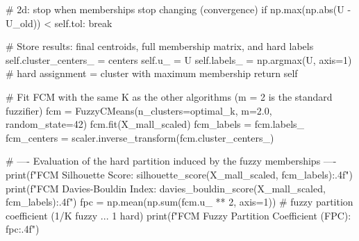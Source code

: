 \begin{codebox}[title={Fuzzy C-Means class (from scratch)}]
            # 2d: stop when memberships stop changing (convergence)
            if np.max(np.abs(U - U_old)) < self.tol:
                break

        # Store results: final centroids, full membership matrix, and hard labels
        self.cluster_centers_ = centers
        self.u_ = U
        self.labels_ = np.argmax(U, axis=1)  # hard assignment = cluster with maximum membership
        return self


# Fit FCM with the same K as the other algorithms (m = 2 is the standard fuzzifier)
fcm = FuzzyCMeans(n_clusters=optimal_k, m=2.0, random_state=42)
fcm.fit(X_mall_scaled)
fcm_labels = fcm.labels_
fcm_centers = scaler.inverse_transform(fcm.cluster_centers_)

# ---- Evaluation of the hard partition induced by the fuzzy memberships ----
print(f"FCM Silhouette Score: {silhouette_score(X_mall_scaled, fcm_labels):.4f}")
print(f"FCM Davies-Bouldin Index: {davies_bouldin_score(X_mall_scaled, fcm_labels):.4f}")
fpc = np.mean(np.sum(fcm.u_ ** 2, axis=1))   # fuzzy partition coefficient (1/K fuzzy ... 1 hard)
print(f"FCM Fuzzy Partition Coefficient (FPC): {fpc:.4f}")
\end{codebox}
